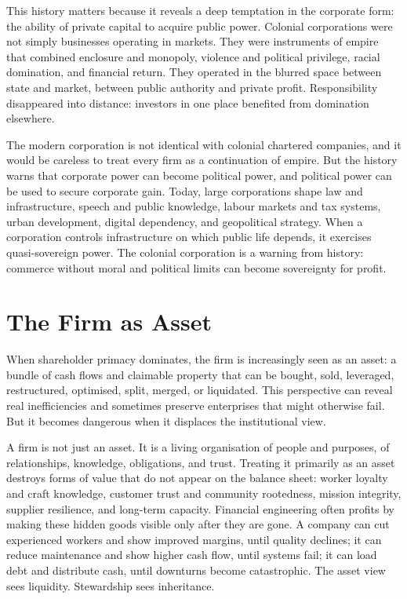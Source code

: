 \documentclass[11pt,a4paper,oneside]{book}
\begin{document}
This history matters because it reveals a deep temptation in the corporate form: the ability of private capital to acquire public power. Colonial corporations were not simply businesses operating in markets. They were instruments of empire that combined enclosure and monopoly, violence and political privilege, racial domination, and financial return. They operated in the blurred space between state and market, between public authority and private profit. Responsibility disappeared into distance: investors in one place benefited from domination elsewhere.

The modern corporation is not identical with colonial chartered companies, and it would be careless to treat every firm as a continuation of empire. But the history warns that corporate power can become political power, and political power can be used to secure corporate gain. Today, large corporations shape law and infrastructure, speech and public knowledge, labour markets and tax systems, urban development, digital dependency, and geopolitical strategy. When a corporation controls infrastructure on which public life depends, it exercises quasi-sovereign power. The colonial corporation is a warning from history: commerce without moral and political limits can become sovereignty for profit.

\section*{The Firm as Asset}

When shareholder primacy dominates, the firm is increasingly seen as an asset: a bundle of cash flows and claimable property that can be bought, sold, leveraged, restructured, optimised, split, merged, or liquidated. This perspective can reveal real inefficiencies and sometimes preserve enterprises that might otherwise fail. But it becomes dangerous when it displaces the institutional view.

A firm is not just an asset. It is a living organisation of people and purposes, of relationships, knowledge, obligations, and trust. Treating it primarily as an asset destroys forms of value that do not appear on the balance sheet: worker loyalty and craft knowledge, customer trust and community rootedness, mission integrity, supplier resilience, and long-term capacity. Financial engineering often profits by making these hidden goods visible only after they are gone. A company can cut experienced workers and show improved margins, until quality declines; it can reduce maintenance and show higher cash flow, until systems fail; it can load debt and distribute cash, until downturns become catastrophic. The asset view sees liquidity. Stewardship sees inheritance.
\end{document}
